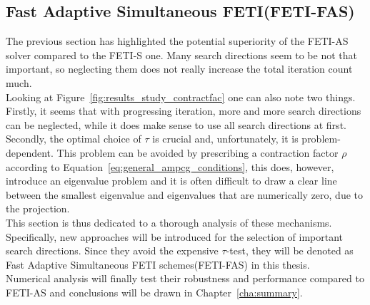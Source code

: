 \subsection{Fast Adaptive Simultaneous FETI(FETI-FAS)}\label{sec:fetifas}
The previous section has highlighted the potential superiority of the FETI-AS solver compared to the FETI-S one. Many search directions seem to be not that important, so neglecting them does not really increase the total iteration count much.\\
Looking at Figure~\ref{fig:results_study_contractfac} one can also note two things. Firstly, it seems that with progressing iteration, more and more search directions can be neglected, while it does make sense to use all search directions at first.\\
Secondly, the optimal choice of $\tau$ is crucial and, unfortunately, it is problem-dependent. This problem can be avoided by prescribing a contraction factor $\rho$ according to Equation~\eqref{eq:general_ampcg_conditions}, this does, however, introduce an eigenvalue problem and it is often difficult to draw a clear line between the smallest eigenvalue and eigenvalues that are numerically zero, due to the projection.\\
This section is thus dedicated to a thorough analysis of these mechanisms. Specifically, new approaches will be introduced for the selection of important search directions. Since they avoid the expensive $\tau$-test, they will be denoted as Fast Adaptive Simultaneous FETI schemes(FETI-FAS) in this thesis.\\
Numerical analysis will finally test their robustness and performance compared to FETI-AS and conclusions will be drawn in Chapter~\ref{cha:summary}.


